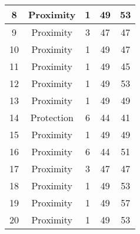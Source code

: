 \documentclass[results.tex]{subfiles}
\begin{document}
\begin{center}
\begin{tabular}{| c || c | c | c | c |}
            \hline
            8                       & Proximity                    & 1                      & 49                      & 53                   \\
            \hline
            9                       & Proximity                    & 3                      & 47                      & 47                   \\
            \hline
            10                      & Proximity                    & 1                      & 49                      & 47                   \\
            \hline
            11                      & Proximity                    & 1                      & 49                      & 45                   \\
            \hline
            12                      & Proximity                    & 1                      & 49                      & 53                   \\
            \hline
            13                      & Proximity                    & 1                      & 49                      & 49                   \\
            \hline
            14                      & Protection                   & 6                      & 44                      & 41                   \\
            \hline
            15                      & Proximity                    & 1                      & 49                      & 49                   \\
            \hline
            16                      & Proximity                    & 6                      & 44                      & 51                   \\
            \hline
            17                      & Proximity                    & 3                      & 47                      & 47                   \\
            \hline
            18                      & Proximity                    & 1                      & 49                      & 53                   \\
            \hline
            19                      & Proximity                    & 1                      & 49                      & 57                   \\
            \hline
            20                      & Proximity                    & 1                      & 49                      & 53                   \\

\end{tabular}
\end{center}
\end{document}
